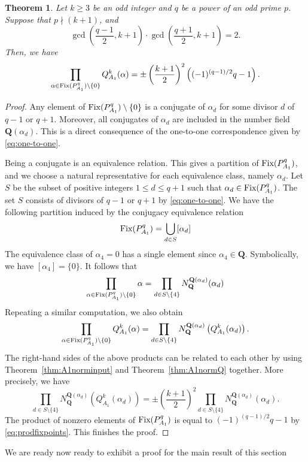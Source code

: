 \documentclass{amsart}
\newcommand{\Q}{\mathbf Q}
\newcommand{\Fix}{\textnormal{Fix}}
\numberwithin{equation}{section}
\theoremstyle{plain}
\newtheorem{theorem}{Theorem}
\theoremstyle{definition}
\begin{document}
\begin{theorem}\label{thm:A1outputprod}
Let $k\geq 3$ be an odd integer and $q$ be a power of an odd prime $p$. Suppose that $p\nmid(k+1)$, and 
$$\gcd\left(\frac{q-1}{2}, k+1\right) \cdot \gcd\left(\frac{q+1}{2}, k+1\right) = 2.$$
Then, we have
$$
\prod\limits_{\alpha\in\Fix(P_{A_1}^q) \setminus\{0\}} Q_{A_{1}}^{k}(\alpha) = \pm\left(\frac{k+1}{2}\right)^{2} \left((-1)^{(q-1)/2}q-1\right).$$
\end{theorem}
\begin{proof}
Any element of $\Fix(P_{A_1}^q)\setminus\{0\}$ is a conjugate of $\alpha_d$ for some divisor $d$ of $q-1$ or $q+1$. Moreover, all conjugates of $\alpha_d$ are included in the number field $\Q(\alpha_d)$. This is a direct consequence of the one-to-one correspondence given by \eqref{eq:one-to-one}. 

Being a conjugate is an equivalence relation. This gives a partition of $\Fix(P_{A_1}^q)$, and we choose a natural representative for each equivalence class, namely $\alpha_d$. Let $S$ be the subset of positive integers $1\leq d \leq q+1$ such that $\alpha_d \in \Fix(P_{A_1}^q)$. The set $S$ consists of divisors of $q-1$ or $q+1$ by \eqref{eq:one-to-one}. We have the following partition induced by the conjugacy equivalence relation 
$$ \Fix(P_{A_1}^q) = \bigcup_{d\in S} [\alpha_d]$$
The equivalence class of $\alpha_4=0$ has a single element since $\alpha_4\in\Q$. Symbolically, we have $[\alpha_4] = \{0\}$. It follows that 
$$\prod\limits_{\alpha\in\Fix(P_{A_1}^q)\setminus\{0\}}\alpha = \prod\limits_{d\in S\setminus\{4\}}  N_{\Q}^{\Q(\alpha_d)}(\alpha_d)$$
Repeating a similar computation, we also obtain
$$ \prod\limits_{\alpha\in\Fix(P_{A_1}^q)\setminus\{0\}}  Q_{A_{1}}^{k}(\alpha)=\prod\limits_{d\in S\setminus\{4\}}  N_{\Q}^{\Q(\alpha_d)}\left(Q_{A_1}^k(\alpha_d)\right).$$
The right-hand sides of the above products can be related to each other by using Theorem~\ref{thm:A1norminput} and Theorem~\ref{thm:A1normQ} together. More precisely, we have 
$$\prod\limits_{d\in S\setminus\{4\}}  N_{\Q}^{\Q(\alpha_d)}\left(Q_{A_1}^k(\alpha_d)\right)=\pm\left(\frac{k+1}{2}\right)^{2} \prod\limits_{d\in S\setminus\{4\}} N_{\Q}^{\Q(\alpha_d)}(\alpha_d).$$
The product of nonzero elements of $\Fix(P_{A_1}^q)$ is equal to $(-1)^{(q-1)/2}q-1$ by \eqref{eq:prodfixpoints}. This finishes the proof.
\end{proof}

We are ready now ready to exhibit a proof for the main result of this section
\end{document}

